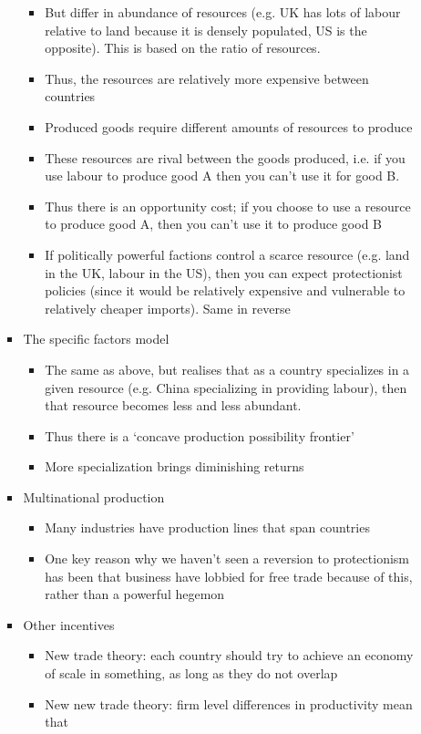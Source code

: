 \documentclass[11pt]{article}
\begin{document}
\begin{itemize}
\begin{itemize}
\begin{itemize}
\begin{itemize}
\item But differ in abundance of resources (e.g. UK has lots of labour
relative to land because it is densely populated, US is the opposite).
This is based on the ratio of resources.
\item Thus, the resources are relatively more expensive between countries
\item Produced goods require different amounts of resources to produce
\item These resources are rival between the goods produced, i.e. if you use
labour to produce good A then you can't use it for good B.
\item Thus there is an opportunity cost; if you choose to use a resource to
produce good A, then you can't use it to produce good B
\item If politically powerful factions control a scarce resource (e.g. land
in the UK, labour in the US), then you can expect protectionist
policies (since it would be relatively expensive and vulnerable to
relatively cheaper imports). Same in reverse
\end{itemize}
\item The specific factors model
\begin{itemize}
\item The same as above, but realises that as a country specializes in a
given resource (e.g. China specializing in providing labour), then
that resource becomes less and less abundant.
\item Thus there is a `concave production possibility frontier'
\item More specialization brings diminishing returns
\end{itemize}
\item Multinational production
\begin{itemize}
\item Many industries have production lines that span countries
\item One key reason why we haven't seen a reversion to protectionism has
been that business have lobbied for free trade because of this, rather
than a powerful hegemon
\end{itemize}
\item Other incentives
\begin{itemize}
\item New trade theory: each country should try to achieve an economy of
scale in something, as long as they do not overlap
\item New new trade theory: firm level differences in productivity mean that

\end{itemize}
\end{itemize}
\end{itemize}
\end{itemize}
\end{document}

